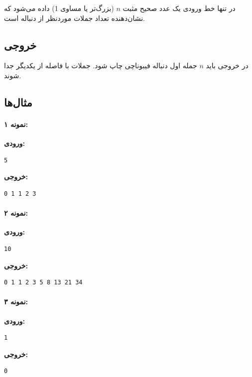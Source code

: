 \documentclass{article}
\begin{document}
در تنها خط ورودی یک عدد صحیح مثبت \( n \) (بزرگ‌تر یا مساوی 1) داده می‌شود که نشان‌دهنده تعداد جملات موردنظر از دنباله است.

\subsection{خروجی}

در خروجی باید \( n \) جمله اول دنباله فیبوناچی چاپ شود. جملات با فاصله از یکدیگر جدا شوند.

\subsection{مثال‌ها}

\paragraph{نمونه ۱:}

\textbf{ورودی:}
\begin{LTR}
\begin{verbatim}
5
\end{verbatim}
\end{LTR}

\textbf{خروجی:}
\begin{LTR}
\begin{verbatim}
0 1 1 2 3
\end{verbatim}
\end{LTR}

\paragraph{نمونه ۲:}

\textbf{ورودی:}
\begin{LTR}
\begin{verbatim}
10
\end{verbatim}
\end{LTR}

\textbf{خروجی:}
\begin{LTR}
\begin{verbatim}
0 1 1 2 3 5 8 13 21 34
\end{verbatim}
\end{LTR}

\paragraph{نمونه ۳:}

\textbf{ورودی:}
\begin{LTR}
\begin{verbatim}
1
\end{verbatim}
\end{LTR}

\textbf{خروجی:}
\begin{LTR}
\begin{verbatim}
0
\end{verbatim}
\end{LTR}
\end{document}
